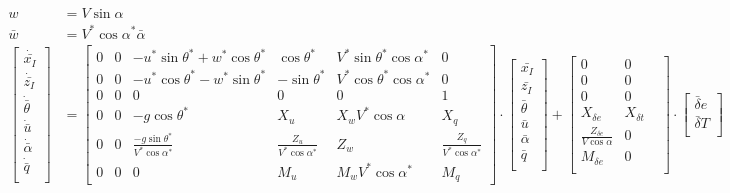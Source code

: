 \documentclass{article}
\begin{document}
\begin{align*}
w &= V \sin \alpha \\
\bar{w} &= V^* \cos \alpha^* \bar{\alpha}\\
\begin{bmatrix}
\dot{\bar{x_I}} \\
\dot{\bar{z_I}} \\
\dot{\bar{\theta}} \\
\dot{\bar{u}} \\
\dot{\bar{\alpha}} \\
\dot{\bar{q}} \\
\end{bmatrix} &= 
\begin{bmatrix}
0 & 0 & -u^* \sin \theta^* + w^* \cos \theta^* & \cos \theta^* & V^*\sin \theta^* \cos \alpha^* & 0 \\
0 & 0 & -u^* \cos \theta^* - w^* \sin \theta^* & -\sin \theta^* & V^* \cos \theta^* \cos \alpha^*& 0 \\
0 & 0 & 0 & 0 & 0 & 1 \\
0 & 0 & -g\cos\theta^* & X_u & X_w V^* \cos\alpha & X_q \\
0 & 0 & \frac{-g\sin\theta^*}{V^* \cos \alpha^*} & \frac{Z_u}{V^* \cos \alpha^*} & Z_w & \frac{Z_q}{V^* \cos \alpha^*} \\
0 & 0 & 0 & M_u & M_w V^* \cos \alpha^* & M_q 
\end{bmatrix}
\cdot
\begin{bmatrix}
\bar{x_I} \\
\bar{z_I} \\
\bar{\theta} \\
\bar{u} \\
\bar{\alpha} \\
\bar{q} \\
\end{bmatrix} 
+
\begin{bmatrix}
0 & 0 & \\
0 & 0 & \\
0 & 0 & \\
X_{\delta e} & X_{\delta t} \\
\frac{Z_{\delta e}}{V \cos \alpha} & 0 \\
M_{\delta e} & 0 \\
\end{bmatrix} \cdot
\begin{bmatrix}
\bar{\delta} e\\
\bar{\delta} T\\
\end{bmatrix}
\end{align*}
\end{document}
